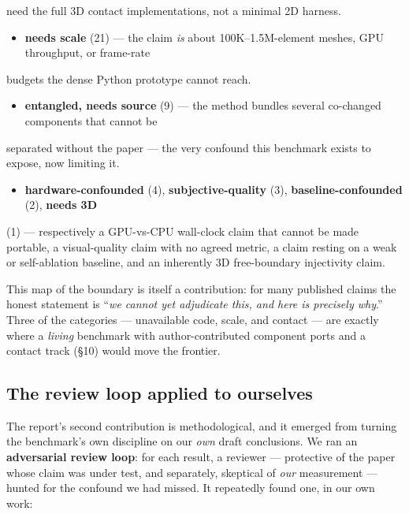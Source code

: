 \documentclass{egpubl}
\begin{document}
  need the full 3D contact implementations, not a minimal 2D harness.
\begin{itemize}
  \item \textbf{needs scale} (21) --- the claim \emph{is} about 100K--1.5M-element meshes, GPU throughput, or frame-rate
\end{itemize}
  budgets the dense Python prototype cannot reach.
\begin{itemize}
  \item \textbf{entangled, needs source} (9) --- the method bundles several co-changed components that cannot be
\end{itemize}
  separated without the paper --- the very confound this benchmark exists to expose, now limiting it.
\begin{itemize}
  \item \textbf{hardware-confounded} (4), \textbf{subjective-quality} (3), \textbf{baseline-confounded} (2), \textbf{needs 3D}
\end{itemize}
  (1) --- respectively a GPU-vs-CPU wall-clock claim that cannot be made portable, a visual-quality
  claim with no agreed metric, a claim resting on a weak or self-ablation baseline, and an inherently
  3D free-boundary injectivity claim.

This map of the boundary is itself a contribution: for many published claims the honest statement is
``\emph{we cannot yet adjudicate this, and here is precisely why}.'' Three of the categories --- unavailable
code, scale, and contact --- are exactly where a \emph{living} benchmark with author-contributed component
ports and a contact track (\S10) would move the frontier.

\subsection{The review loop applied to ourselves}

The report's second contribution is methodological, and it emerged from turning the benchmark's own
discipline on our \emph{own} draft conclusions. We ran an \textbf{adversarial review loop}: for each result, a
reviewer --- protective of the paper whose claim was under test, and separately, skeptical of \emph{our}
measurement --- hunted for the confound we had missed. It repeatedly found one, in our own work:
\end{document}

